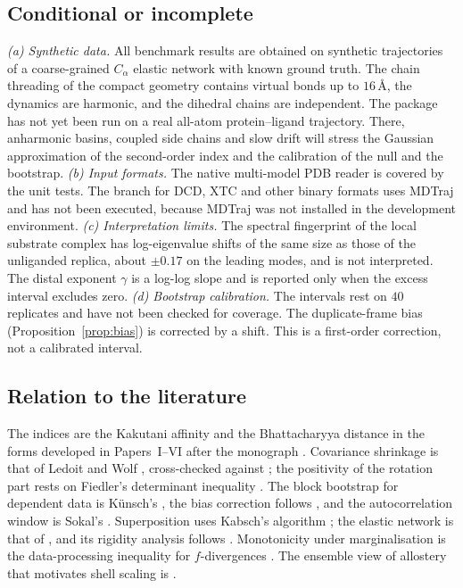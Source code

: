 \documentclass[11pt,reqno]{amsart}
\theoremstyle{plain}
\theoremstyle{definition}
\theoremstyle{remark}
\numberwithin{equation}{section}
\begin{document}
\subsection*{Conditional or incomplete}
\begin{sloppypar}
\emph{(a) Synthetic data.} All benchmark results are obtained on synthetic trajectories of a coarse-grained $C_\alpha$ elastic network with known ground truth. The chain threading of the compact geometry contains virtual bonds up to $16$\,\AA, the dynamics are harmonic, and the dihedral chains are independent. The package has not yet been run on a real all-atom protein--ligand trajectory. There, anharmonic basins, coupled side chains and slow drift will stress the Gaussian approximation of the second-order index and the calibration of the null and the bootstrap.
\emph{(b) Input formats.} The native multi-model PDB reader is covered by the unit tests. The branch for DCD, XTC and other binary formats uses MDTraj \cite{McGibbon2015} and has not been executed, because MDTraj was not installed in the development environment.
\emph{(c) Interpretation limits.} The spectral fingerprint of the local substrate complex has log-eigenvalue shifts of the same size as those of the unliganded replica, about $\pm0.17$ on the leading modes, and is not interpreted. The distal exponent $\gamma$ is a log-log slope and is reported only when the excess interval excludes zero.
\emph{(d) Bootstrap calibration.} The intervals rest on $40$ replicates and have not been checked for coverage. The duplicate-frame bias (Proposition~\ref{prop:bias}) is corrected by a shift. This is a first-order correction, not a calibrated interval.
\end{sloppypar}

\subsection*{Relation to the literature}
The indices are the Kakutani affinity \cite{Kakutani1948} and the Bhattacharyya distance \cite{Bhattacharyya1943} in the forms developed in Papers~I--VI \cite{ChenChen2026I,ChenChen2026II,ChenChen2026III,ChenChen2026IV,ChenChen2026V,ChenChen2026VI} after the monograph \cite{Chen2026}. Covariance shrinkage is that of Ledoit and Wolf \cite{LedoitWolf2004}, cross-checked against \cite{Pedregosa2011}; the positivity of the rotation part rests on Fiedler's determinant inequality \cite{Fiedler1971}. The block bootstrap for dependent data is K\"unsch's \cite{Kunsch1989}, the bias correction follows \cite{EfronTibshirani1993}, and the autocorrelation window is Sokal's \cite{Sokal1997}. Superposition uses Kabsch's algorithm \cite{Kabsch1976}; the elastic network is that of \cite{Tirion1996,Atilgan2001}, and its rigidity analysis follows \cite{AsimowRoth1978}. Monotonicity under marginalisation is the data-processing inequality for $f$-divergences \cite{LieseVajda2006}. The ensemble view of allostery that motivates shell scaling is \cite{Motlagh2014}.
\end{document}
